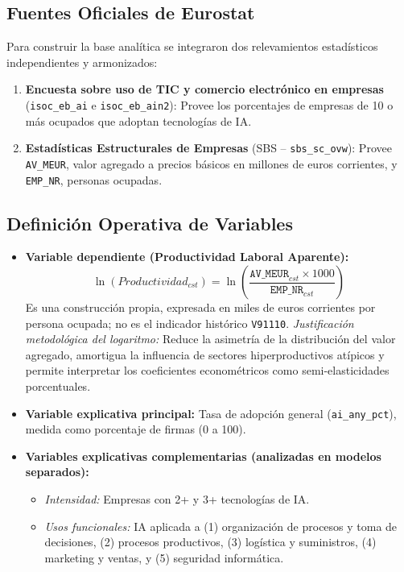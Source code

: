 \documentclass[12pt,a4paper]{article}
\begin{document}
\subsection{Fuentes Oficiales de Eurostat}
Para construir la base analítica se integraron dos relevamientos estadísticos independientes y armonizados:
\begin{enumerate}[label=\alph*)]
  \item \textbf{Encuesta sobre uso de TIC y comercio electrónico en empresas} (\texttt{isoc\_eb\_ai} e \texttt{isoc\_eb\_ain2}): Provee los porcentajes de empresas de 10 o más ocupados que adoptan tecnologías de IA.
  \item \textbf{Estadísticas Estructurales de Empresas} (SBS -- \texttt{sbs\_sc\_ovw}): Provee \texttt{AV\_MEUR}, valor agregado a precios básicos en millones de euros corrientes, y \texttt{EMP\_NR}, personas ocupadas.
\end{enumerate}

\subsection{Definición Operativa de Variables}
\begin{itemize}[leftmargin=*]
  \item \textbf{Variable dependiente (Productividad Laboral Aparente):}
  \begin{equation}
    \ln(Productividad_{cst}) = \ln\left( \frac{\texttt{AV\_MEUR}_{cst} \times 1000}{\texttt{EMP\_NR}_{cst}} \right)
  \end{equation}
  Es una construcción propia, expresada en miles de euros corrientes por persona ocupada; no es el indicador histórico \texttt{V91110}.
  \textit{Justificación metodológica del logaritmo:} Reduce la asimetría de la distribución del valor agregado, amortigua la influencia de sectores hiperproductivos atípicos y permite interpretar los coeficientes econométricos como semi-elasticidades porcentuales.
  \item \textbf{Variable explicativa principal:} Tasa de adopción general (\texttt{ai\_any\_pct}), medida como porcentaje de firmas (0 a 100).
  \item \textbf{Variables explicativas complementarias (analizadas en modelos separados):}
    \begin{itemize}
      \item \textit{Intensidad:} Empresas con 2+ y 3+ tecnologías de IA.
      \item \textit{Usos funcionales:} IA aplicada a (1) organización de procesos y toma de decisiones, (2) procesos productivos, (3) logística y suministros, (4) marketing y ventas, y (5) seguridad informática.
    \end{itemize}
\end{itemize}
\end{document}

